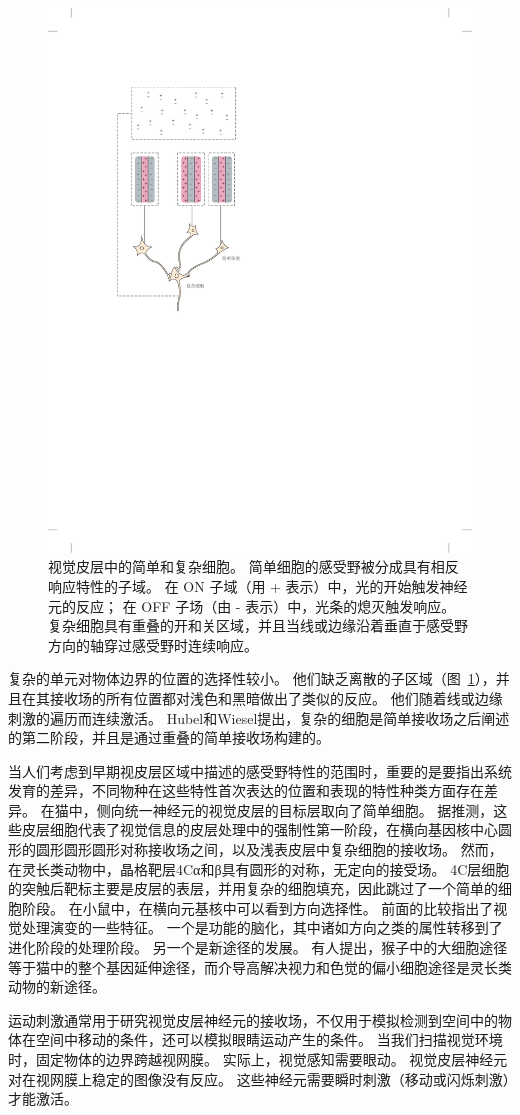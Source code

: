\begin{figure}[htbp]
	\centering
	\includegraphics[width=0.5\linewidth]{chap23/fig_23_4}
	\caption{视觉皮层中的简单和复杂细胞。
		简单细胞的感受野被分成具有相反响应特性的子域。
		在 ON 子域（用 + 表示）中，光的开始触发神经元的反应；
		在 OFF 子场（由 - 表示）中，光条的熄灭触发响应。
		复杂细胞具有重叠的开和关区域，并且当线或边缘沿着垂直于感受野方向的轴穿过感受野时连续响应。}
	\label{fig:23_4}
\end{figure}


复杂的单元对物体边界的位置的选择性较小。
他们缺乏离散的子区域（图~\ref{fig:23_4}），并且在其接收场的所有位置都对浅色和黑暗做出了类似的反应。
他们随着线或边缘刺激的遍历而连续激活。
Hubel和Wiesel提出，复杂的细胞是简单接收场之后阐述的第二阶段，并且是通过重叠的简单接收场构建的。


当人们考虑到早期视皮层区域中描述的感受野特性的范围时，重要的是要指出系统发育的差异，不同物种在这些特性首次表达的位置和表现的特性种类方面存在差异。
在猫中，侧向统一神经元的视觉皮层的目标层取向了简单细胞。
据推测，这些皮层细胞代表了视觉信息的皮层处理中的强制性第一阶段，在横向基因核中心圆形的圆形圆形圆形对称接收场之间，以及浅表皮层中复杂细胞的接收场。
然而，在灵长类动物中，晶格靶层4Cα和β具有圆形的对称，无定向的接受场。
4C层细胞的突触后靶标主要是皮层的表层，并用复杂的细胞填充，因此跳过了一个简单的细胞阶段。
在小鼠中，在横向元基核中可以看到方向选择性。
前面的比较指出了视觉处理演变的一些特征。
一个是功能的脑化，其中诸如方向之类的属性转移到了进化阶段的处理阶段。
另一个是新途径的发展。
有人提出，猴子中的大细胞途径等于猫中的整个基因延伸途径，而介导高解决视力和色觉的偏小细胞途径是灵长类动物的新途径。


运动刺激通常用于研究视觉皮层神经元的接收场，不仅用于模拟检测到空间中的物体在空间中移动的条件，还可以模拟眼睛运动产生的条件。
当我们扫描视觉环境时，固定物体的边界跨越视网膜。
实际上，视觉感知需要眼动。
视觉皮层神经元对在视网膜上稳定的图像没有反应。
这些神经元需要瞬时刺激（移动或闪烁刺激）才能激活。


